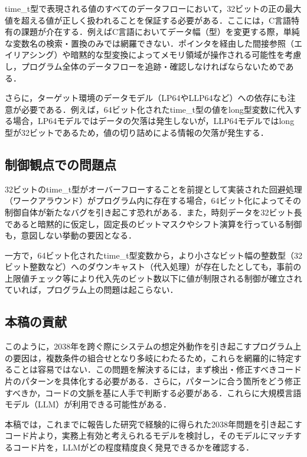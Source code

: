 \documentclass[submit,techrep,noauthor]{ipsj-lualatex}
\begin{document}
time\_t型で表現される値のすべてのデータフローにおいて，32ビットの正の最大値を超える値が正しく扱われることを保証する必要がある．ここには，C言語特有の課題が介在する．例えばC言語においてデータ幅（型）を変更する際，単純な変数名の検索・置換のみでは網羅できない．ポインタを経由した間接参照（エイリアシング）や暗黙的な型変換によってメモリ領域が操作される可能性を考慮し，プログラム全体のデータフローを追跡・確認しなければならないためである．

さらに，ターゲット環境のデータモデル（LP64やLLP64など）への依存にも注意が必要である．例えば，64ビット化されたtime\_t型の値をlong型変数に代入する場合，LP64モデルではデータの欠落は発生しないが，LLP64モデルではlong型が32ビットであるため，値の切り詰めによる情報の欠落が発生する．

\subsection{制御観点での問題点}

32ビットのtime\_t型がオーバーフローすることを前提として実装された回避処理（ワークアラウンド）がプログラム内に存在する場合，64ビット化によってその制御自体が新たなバグを引き起こす恐れがある．また，時刻データを32ビット長であると暗黙的に仮定し，固定長のビットマスクやシフト演算を行っている制御も，意図しない挙動の要因となる．

一方で，64ビット化されたtime\_t型変数から，より小さなビット幅の整数型（32ビット整数など）へのダウンキャスト（代入処理）が存在したとしても，事前の上限値チェック等により代入先のビット数以下に値が制限される制御が確立されていれば，プログラム上の問題は起こらない．

\subsection{本稿の貢献}

このように，2038年を跨ぐ際にシステムの想定外動作を引き起こすプログラム上の要因は，複数条件の組合せとなり多岐にわたるため，これらを網羅的に特定することは容易ではない．この問題を解決するには，まず検出・修正すべきコード片のパターンを具体化する必要がある．さらに，パターンに合う箇所をどう修正すべきか，コードの文脈を基に人手で判断する必要がある．これらに大規模言語モデル（LLM）が利用できる可能性がある．

本稿では，これまでに報告した研究で経験的に得られた2038年問題を引き起こすコード片より，実務上有効と考えられるモデルを検討し，そのモデルにマッチするコード片を，LLMがどの程度精度良く発見できるかを確認する．
\end{document}
